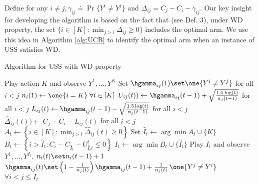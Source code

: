 Define for any $i\neq j, \gamma_{ij}\doteq \Pr\{Y^i\neq Y^j\}$ and $\Delta_{ij}=C_j-C_i -\gamma_{ij}$. Our key insight for developing the algorithm is based on the fact that (see Def. 3),
under WD property, the set $\{i \in [K]: \min_{j> i}\Delta_{ij}\geq 0\}$ includes the optimal arm. We use this idea in Algorithm \ref{alg:UCB} to identify the optimal arm when an instance of USS satisfies WD. 

\begin{center}
\begin{minipage}{0.48\textwidth}
		\begin{algorithm}[H]
			\caption{Algorithm for USS with WD property} %
			\label{alg:UCB}
			\begin{algorithmic}[1]
				\STATE Play action $K$ and observe $Y^1,\dots,Y^K$
				\STATE Set $\hgamma_{ij}(1) \set \one{Y^i\ne Y^j}$ for all $i< j$
				\STATE $n_i(1)\leftarrow \one{i=K} \; \forall i\in [K]$
				\STATE $U_{ij}(t))\leftarrow\hgamma_{ij}(t-1) + \sqrt{\frac{1.5\log(t)}{n_j(t-1)}}$  for all $i< j$ \label{algo:UCB}
				\STATE $L_{ij}(t)\leftarrow\hgamma_{ij}(t-1) - \sqrt{\frac{1.5\log(t)}{n_j(t-1)}}$  for all $i< j$ \label{algo:LCB}
				\STATE $\hat{\Delta}_{ij}(t))\leftarrow C_j-C_i-L_{ij}(t)$ for all $i< j$
				\STATE $A_t \leftarrow \left \{i \in [K]:\displaystyle \min_{j> i}\hat{\Delta}_{ij}(t)\geq 0 \right\}$ \label{algo:sort}
				\STATE Set $\hat{I}_t\leftarrow \arg \min A_t\cup \{K\} $
				\STATE $B_t \leftarrow \left\{i>\hat{I}_t: C_i- C_{\hat{I}_t}-U_{\hat{I}_t i}^t \leq 0\right \}$
				\STATE $I_t\leftarrow \arg\min B_t\cup \{\hat{I}_t\}$
				\STATE Play $I_t$ and observe $Y^1,\dots,Y^{I_t}$.
				\STATE $n_i(t) \set n_i(t-1)+1$\\
				 \STATE $\hgamma_{ij}(t) \set \left (1-\frac{1}{n_j(t)}\right )
				 \hgamma_{ij}(t-1) + \frac{1}{n_j(t)} \,\one{Y^j\ne Y^i}$ \\ $\forall i<j \leq I_t$ \label{algo:Update}
				\ENDFOR
				\ENDFOR
			\end{algorithmic}
		\end{algorithm}
	\end{minipage}
\end{center}

